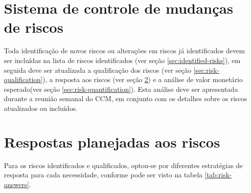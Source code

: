 \section{Sistema de controle de mudanças de riscos}
\label{sec:risk-change-control-system}

Toda identificação de novos riscos ou alterações em riscos já identificados devem ser incluídas na lista de riscos identificados (ver seção \ref{sec:identified-risks}), em seguida deve ser atualizada a qualificação dos riscos (ver seção \ref{sec:risk-qualification}), a resposta aos riscos (ver seção \ref{risk-answers}) e a análise de valor monetário esperado(ver seção \ref{sec:risk-quantification}). Esta análise deve ser apresentada durante a reunião semanal do CCM, em conjunto com os detalhes sobre os riscos atualizados ou incluídos.


%
%
%

\section{Respostas planejadas aos riscos}
\label{risk-answers}

Para os riscos identificados e qualificados, optou-se por diferentes estratégias de resposta para cada necessidade, conforme pode ser visto na tabela \ref{tab:risk-answers}.


